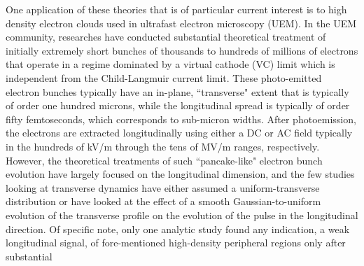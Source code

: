 \documentclass[aps,prl,twocolumn,showpacs,superscriptaddress,groupedaddress]{revtex4-1}  %
\begin{document}
One application of these theories that is of particular current interest is to 
high density electron clouds used in ultrafast electron microscopy (UEM).  
In the UEM community, researches have conducted substantial theoretical treatment of initially 
extremely short bunches of thousands to hundreds of millions of electrons that operate in a regime dominated
by a virtual cathode (VC) limit which is independent from
the Child-Langmuir current limit\cite{Luiten:2004_uniform_ellipsoidal,Valfells:2002_vc_limit,King:2005_review,Miller:2014_science_review,Tao:2012_space_charge}.  These photo-emitted electron bunches
typically have an in-plane, ``transverse" extent 
that is typically of order one hundred microns, while the  longitudinal 
spread is typically of order fifty femtoseconds, which corresponds to sub-micron widths\cite{King:2005_review}.  
After photoemission, 
the electrons are extracted longitudinally using either a DC 
or AC field typically in the hundreds of kV/m\cite{Tao:2012_space_charge,Portman:2013_computational_characterization,van_Oudheusden:2007_rf_compression_theory,Sciaini:2011_review} through the tens of MV/m \cite{Li:2014_single_shot,Musumeci:2010_single_shot} ranges, respectively.   However, the theoretical 
treatments of such ``pancake-like" electron 
bunch evolution have largely focused on the longitudinal dimension\cite{Luiten:2004_uniform_ellipsoidal,Siwick:2002_mean_field,Qian:2002_fluid_flow,Reed:2006_short_pulse_theory,Collin:2005_broadening}, 
and the few studies looking at transverse dynamics have either assumed a uniform-transverse
distribution \cite{Collin:2005_broadening} or have looked at the effect of a smooth Gaussian-to-uniform evolution of the transverse profile
on the evolution of the pulse in the longitudinal direction\cite{Reed:2006_short_pulse_theory}.  
Of specific note, only one analytic study found any indication, a weak longitudinal signal,
of fore-mentioned high-density peripheral regions\cite{Reed:2006_short_pulse_theory} only after substantial
\end{document}
